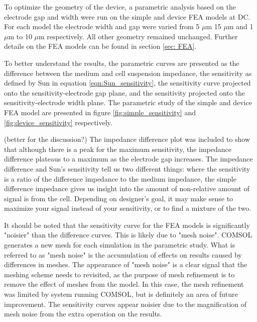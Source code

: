 \par To optimize the geometry of the device, a parametric analysis based on the electrode gap and width were run on the simple and device FEA models at DC. For each model the electrode width and gap were varied from 5 $\mu$m 15 $\mu$m and 1 $\mu$m to 10 $\mu$m respectively. All other geometry remained unchanged. Further details on the FEA models can be found in section \ref{sec: FEA}.

\par To better understand the results, the parametric curves are presented as the difference between the medium and cell suspension impedance, the sensitivity as defined by Sun in equation \ref{eqn:Sun_sensitivity}, the sensitivity curve projected onto the sensitivity-electrode gap plane, and the sensitivity projected onto the sensitivity-electrode width plane. The parametric study of the simple and device FEA model are presented in figure \ref{fig:simple_sensitivity} and \ref{fig:device_sensitivity} respectively.

\par (better for the discussion?) The impedance difference plot was included to show that although there is a peak for the maximum sensitivity, the impedance difference plateaus to a maximum as the electrode gap increases. The impedance difference and Sun's sensitivity tell us two different things: where the sensitivity is a ratio of the difference impedance to the medium impedance, the simple difference impedance gives us insight into the amount of non-relative amount of signal is from the cell. Depending on designer's goal, it may make sense to maximize your signal instead of your sensitivity, or to find a mixture of the two. 

\par It should be noted that the sensitivity curve for the FEA models is significantly "noisier" than the difference curves. This is likely due to "mesh noise". COMSOL generates a new mesh for each simulation in the parametric study. What is referred to as "mesh noise" is the accumulation of effects on results caused by differences in meshes. The appearance of "mesh noise" is a clear signal that the meshing scheme needs to revisited, as the purpose of mesh refinement is to remove the effect of meshes from the model. In this case, the mesh refinement was limited by system running COMSOL, but is definitely an area of future improvement. The sensitivity curves appear noisier due to the magnification of mesh noise from the extra operation on the results.

